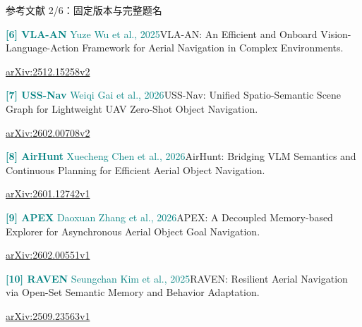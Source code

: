 \documentclass[aspectratio=169,10pt]{beamer}
\def\slidesource{}
\begin{document}
\gdef\slidesource{\href{https://arxiv.org/html/2512.15258v2}{[6] VLA-AN}；\href{https://arxiv.org/html/2602.00708v2}{[7] USS-Nav}；\href{https://arxiv.org/html/2601.12742v1}{[8] AirHunt}；\href{https://arxiv.org/html/2602.00551v1}{[9] APEX}；\href{https://arxiv.org/html/2509.23563v1}{[10] RAVEN}}
\begin{frame}[t,label=refs2]{参考文献 2/6：固定版本与完整题名}
\relax
{\fontsize{8.3}{10.6}\selectfont
\par\textcolor{teal}{\textbf{[6] VLA-AN} Yuze Wu et al., 2025}\quad VLA-AN: An Efficient and Onboard Vision-Language-Action Framework for Aerial Navigation in Complex Environments.\par\href{https://arxiv.org/html/2512.15258v2}{arXiv:2512.15258v2}\par\vspace{1.8mm}
\par\textcolor{teal}{\textbf{[7] USS-Nav} Weiqi Gai et al., 2026}\quad USS-Nav: Unified Spatio-Semantic Scene Graph for Lightweight UAV Zero-Shot Object Navigation.\par\href{https://arxiv.org/html/2602.00708v2}{arXiv:2602.00708v2}\par\vspace{1.8mm}
\par\textcolor{teal}{\textbf{[8] AirHunt} Xuecheng Chen et al., 2026}\quad AirHunt: Bridging VLM Semantics and Continuous Planning for Efficient Aerial Object Navigation.\par\href{https://arxiv.org/html/2601.12742v1}{arXiv:2601.12742v1}\par\vspace{1.8mm}
\par\textcolor{teal}{\textbf{[9] APEX} Daoxuan Zhang et al., 2026}\quad APEX: A Decoupled Memory-based Explorer for Asynchronous Aerial Object Goal Navigation.\par\href{https://arxiv.org/html/2602.00551v1}{arXiv:2602.00551v1}\par\vspace{1.8mm}
\par\textcolor{teal}{\textbf{[10] RAVEN} Seungchan Kim et al., 2025}\quad RAVEN: Resilient Aerial Navigation via Open-Set Semantic Memory and Behavior Adaptation.\par\href{https://arxiv.org/html/2509.23563v1}{arXiv:2509.23563v1}\par\vspace{1.8mm}
}
\end{frame}
\gdef\slidesource{\href{https://arxiv.org/html/2505.09108v1}{[11] Air-Ground}；\href{https://arxiv.org/html/2606.14772v1}{[12] ScoutVLA}；\href{https://arxiv.org/html/2607.10180v2}{[13] ActiveFly-Bench}；\href{https://arxiv.org/html/2601.07558v1}{[14] FlyCo}；\href{https://arxiv.org/html/2512.21887v2}{[15] ANWM}}
\end{document}

